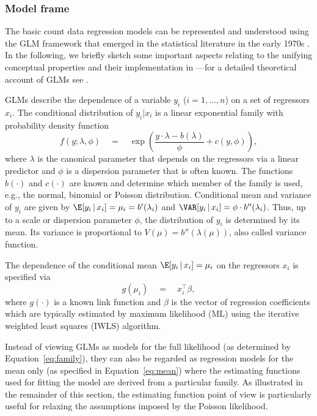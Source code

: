 \documentclass{Z}
\begin{document}
\subsubsection{Model frame}

The basic count data regression models can
be represented and understood using the GLM
framework that emerged in the statistical literature in the early 1970s
\citep{countreg:Nelder+Wedderburn:1972}. In the following, we briefly
sketch some important aspects relating to the unifying conceptual properties
and their implementation in ---for a detailed theoretical account of GLMs
see \cite{countreg:McCullagh+Nelder:1989}.

GLMs describe the dependence of a variable $y_i$ ($i = 1, \dots, n$)
on a set of regressors $x_i$. The conditional distribution of
$y_i | x_i$ is a linear exponential family with probability density function
\begin{equation} \label{eq:family}
f(y; \lambda, \phi) \quad = \quad
                              \exp \left( \frac{y \cdot \lambda - b(\lambda)}{\phi} +
                              c(y, \phi) \right),
\end{equation}
where $\lambda$ is the canonical parameter that depends on the regressors via
a linear predictor and $\phi$ is a dispersion parameter that is often known.
The functions $b(\cdot)$ and $c(\cdot)$ are known and determine which member
of the family is used, e.g., the normal, binomial or Poisson distribution.
Conditional mean and variance of $y_i$ are given by
$\E[y_i \, | \, x_i] = \mu_i = b'(\lambda_i)$ and
$\VAR[y_i \, | \, x_i] = \phi \cdot b''(\lambda_i)$. Thus, up to a scale
or dispersion parameter $\phi$, the distribution of $y_i$ is determined by
its mean. Its variance is proportional to $V(\mu) = b''(\lambda(\mu))$,
also called variance function.

The dependence of the conditional mean $\E[y_i \, | \, x_i] = \mu_i$
on the regressors $x_i$ is specified via
\begin{equation} \label{eq:mean}
g(\mu_i) \quad = \quad x_i^\top \beta,
\end{equation}
where $g(\cdot)$ is a known link function and $\beta$ is the vector of regression
coefficients which are typically estimated by maximum likelihood (ML)
using the iterative weighted least squares (IWLS) algorithm.

Instead of viewing GLMs as models for the full likelihood (as determined by
Equation~\ref{eq:family}), they can also be regarded as regression models for the
mean only (as specified in Equation~\ref{eq:mean}) where the estimating functions
used for fitting the model are derived from a particular family. As illustrated 
in the remainder of this section, the estimating function point of view is particularly
useful for relaxing the assumptions imposed by the Poisson likelihood.
\end{document}
